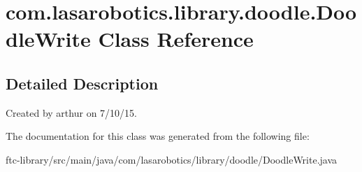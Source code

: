\hypertarget{classcom_1_1lasarobotics_1_1library_1_1doodle_1_1_doodle_write}{}\section{com.\+lasarobotics.\+library.\+doodle.\+Doodle\+Write Class Reference}
\label{classcom_1_1lasarobotics_1_1library_1_1doodle_1_1_doodle_write}


\subsection{Detailed Description}
Created by arthur on 7/10/15. 

The documentation for this class was generated from the following file\+:\begin{DoxyCompactItemize}
\item 
ftc-\/library/src/main/java/com/lasarobotics/library/doodle/Doodle\+Write.\+java\end{DoxyCompactItemize}
